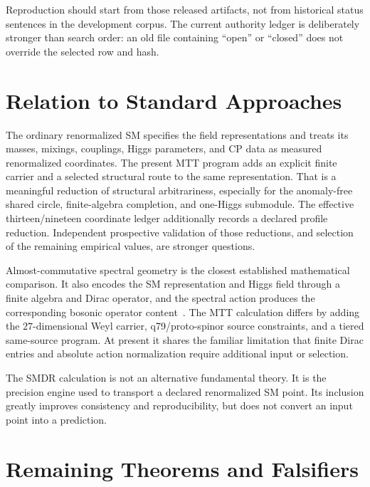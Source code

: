 \documentclass[11pt]{article}
\begin{document}
Reproduction should start from those released artifacts, not from historical status sentences in
the development corpus.  The current authority ledger is deliberately stronger than search order:
an old file containing ``open'' or ``closed'' does not override the selected row and hash.

\section{Relation to Standard Approaches}

The ordinary renormalized SM specifies the field representations and treats its masses, mixings,
couplings, Higgs parameters, and CP data as measured renormalized coordinates.  The present MTT
program adds an explicit finite carrier and a selected structural route to the same representation.
That is a meaningful reduction of structural arbitrariness, especially for the anomaly-free shared
circle, finite-algebra completion, and one-Higgs submodule.  The effective thirteen/nineteen
coordinate ledger additionally records a declared profile reduction.  Independent prospective
validation of those reductions, and selection of the remaining empirical values, are stronger
questions.

Almost-commutative spectral geometry is the closest established mathematical comparison.  It also
encodes the SM representation and Higgs field through a finite algebra and Dirac operator, and the
spectral action produces the corresponding bosonic operator content~\cite{ChamseddineConnes1996}.
The MTT calculation differs by adding the $27$-dimensional Weyl carrier, q79/proto-spinor source
constraints, and a tiered same-source program.  At present it shares the familiar limitation that
finite Dirac entries and absolute action normalization require additional input or selection.

The SMDR calculation is not an alternative fundamental theory.  It is the precision engine used to
transport a declared renormalized SM point.  Its inclusion greatly improves consistency and
reproducibility, but does not convert an input point into a prediction.

\section{Remaining Theorems and Falsifiers}
\end{document}
